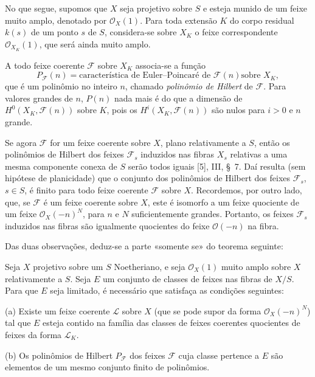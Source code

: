 
No que segue, supomos que $X$ seja projetivo sobre $S$ e esteja munido de um
feixe muito amplo, denotado por $\mathcal O_X(1)$. Para toda extensão $K$ do
corpo residual $k(s)$ de um ponto $s$ de $S$, considera-se sobre $X_K$ o feixe
correspondente $\mathcal O_{X_K}(1)$, que será ainda muito amplo.

A todo feixe coerente $\mathcal F$ sobre $X_K$ associa-se a função
\[
P_{\mathcal F}(n)=\text{característica de Euler--Poincaré de $\mathcal F(n)$
sobre $X_K$},
\]
que é um polinômio no inteiro $n$, chamado \emph{polinômio de Hilbert} de
$\mathcal F$. Para valores grandes de $n$, $P(n)$ nada mais é do que a
dimensão de $H^0(X_K,\mathcal F(n))$ sobre $K$, pois os
$H^i(X_K,\mathcal F(n))$ são nulos para $i>0$ e $n$ grande.

Se agora $\mathcal F$ for um feixe coerente sobre $X$, plano relativamente a
$S$, então os polinômios de Hilbert dos feixes $\mathcal F_s$ induzidos nas
fibras $X_s$ relativas a uma mesma componente conexa de $S$ serão todos iguais
[5], III, \S~7. Daí resulta (sem hipótese de planicidade) que o conjunto dos
polinômios de Hilbert dos feixes $\mathcal F_s$, $s\in S$, é finito para
todo feixe coerente $\mathcal F$ sobre $X$.
Recordemos, por outro lado, que, se $\mathcal F$ é um feixe coerente sobre $X$,
este é isomorfo a um feixe quociente de um feixe $\mathcal O_X(-n)^N$, para
$n$ e $N$ suficientemente grandes. Portanto, os feixes $\mathcal F_s$
induzidos nas fibras são igualmente quocientes do feixe $\mathcal O(-n)$ na
fibra.

Das duas observações, deduz-se a parte «somente se» do teorema seguinte:

 Seja $X$ projetivo sobre um $S$ Noetheriano, e seja
$\mathcal O_X(1)$ muito amplo sobre $X$ relativamente a $S$. Seja $E$ um
conjunto de classes de feixes nas fibras de $X/S$. Para que $E$ seja limitado,
é necessário que
satisfaça as condições seguintes:

\medskip
\noindent (a) Existe um feixe coerente $\mathcal L$ sobre $X$ (que se pode
supor da forma $\mathcal O_X(-n)^N$) tal que $E$ esteja contido na família das
classes de feixes coerentes quocientes de feixes da forma $\mathcal L_K$.

\smallskip
\noindent (b) Os polinômios de Hilbert $P_{\mathcal F}$ dos feixes
$\mathcal F$ cuja classe pertence a $E$ são elementos de um mesmo conjunto
finito de polinômios.

